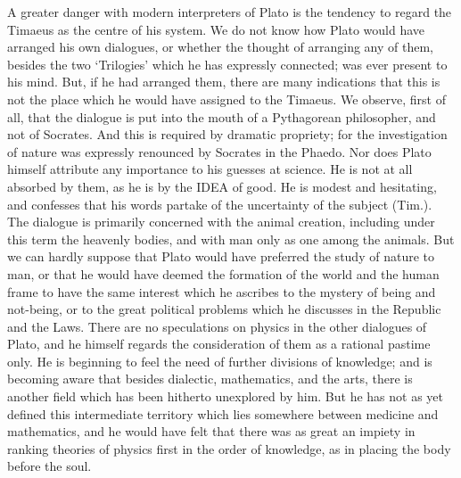 \documentclass[11pt,letter]{article}
\begin{document}
\par  A greater danger with modern interpreters of Plato is the tendency to regard the Timaeus as the centre of his system. We do not know how Plato would have arranged his own dialogues, or whether the thought of arranging any of them, besides the two ‘Trilogies’ which he has expressly connected; was ever present to his mind. But, if he had arranged them, there are many indications that this is not the place which he would have assigned to the Timaeus. We observe, first of all, that the dialogue is put into the mouth of a Pythagorean philosopher, and not of Socrates. And this is required by dramatic propriety; for the investigation of nature was expressly renounced by Socrates in the Phaedo. Nor does Plato himself attribute any importance to his guesses at science. He is not at all absorbed by them, as he is by the IDEA of good. He is modest and hesitating, and confesses that his words partake of the uncertainty of the subject (Tim.). The dialogue is primarily concerned with the animal creation, including under this term the heavenly bodies, and with man only as one among the animals. But we can hardly suppose that Plato would have preferred the study of nature to man, or that he would have deemed the formation of the world and the human frame to have the same interest which he ascribes to the mystery of being and not-being, or to the great political problems which he discusses in the Republic and the Laws. There are no speculations on physics in the other dialogues of Plato, and he himself regards the consideration of them as a rational pastime only. He is beginning to feel the need of further divisions of knowledge; and is becoming aware that besides dialectic, mathematics, and the arts, there is another field which has been hitherto unexplored by him. But he has not as yet defined this intermediate territory which lies somewhere between medicine and mathematics, and he would have felt that there was as great an impiety in ranking theories of physics first in the order of knowledge, as in placing the body before the soul.
\end{document}
